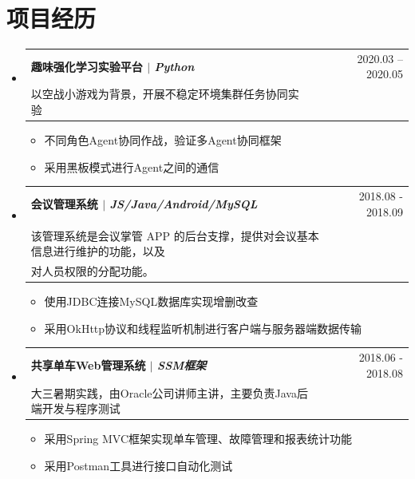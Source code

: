 \documentclass[a4paper,11pt]{ctexart}
\makeatletter
\newcommand{\CVItem}[1]{
	\item\small{
		{#1 \vspace{-2pt}}
	}
}
\newcommand{\CVSubheading}[4]{
	\vspace{-2pt}\item
	\begin{tabular*}{0.97\textwidth}[t]{l@{\extracolsep{\fill}}r}
		\textbf{#1} & #2 \\
		\small#3 & \small #4 \\
	\end{tabular*}\vspace{-7pt}
}
\newcommand{\CVSubHeadingListStart}{\begin{itemize}[leftmargin=0.5cm, label={}]}
\newcommand{\CVSubHeadingListEnd}{\end{itemize}}
\newcommand{\CVItemListStart}{\begin{itemize}}
\newcommand{\CVItemListEnd}{\end{itemize}\vspace{-5pt}}
\makeatother
\begin{document}
	\section{项目经历}
	\CVSubHeadingListStart
	\CVSubheading
	{{趣味强化学习实验平台}  $|$ \emph{\small{Python}}}{2020.03 -- 2020.05}
	{以空战小游戏为背景，开展不稳定环境集群任务协同实验}{}
	\CVItemListStart
	\CVItem{不同角色Agent协同作战，验证多Agent协同框架}
	\CVItem{采用黑板模式进行Agent之间的通信}
	\CVItemListEnd
	\CVSubheading
	{{会议管理系统}  $|$ \emph{\small{JS/Java/Android/MySQL}}}{2018.08 - 2018.09}
	{\makecell[l]{2018年(第6届)中国大学生计算机设计大赛软件服务外包竞赛（移动终端应用）。\\
			该管理系统是会议掌管 APP 的后台支撑，提供对会议基本信息进行维护的功能，以及\\
			对人员权限的分配功能。
	}}{}
	\CVItemListStart
	\CVItem{使用JDBC连接MySQL数据库实现增删改查}
	\CVItem{采用OkHttp协议和线程监听机制进行客户端与服务器端数据传输}
	\CVItemListEnd
	\CVSubheading
	{{共享单车Web管理系统}  $|$ \emph{\small{SSM框架}}}{2018.06 - 2018.08}
	{大三暑期实践，由Oracle公司讲师主讲，主要负责Java后端开发与程序测试}{}
	\CVItemListStart
	\CVItem{采用Spring MVC框架实现单车管理、故障管理和报表统计功能}
	\CVItem{采用Postman工具进行接口自动化测试}
	\CVItemListEnd
	
	\CVSubHeadingListEnd
	

	
\end{document}
